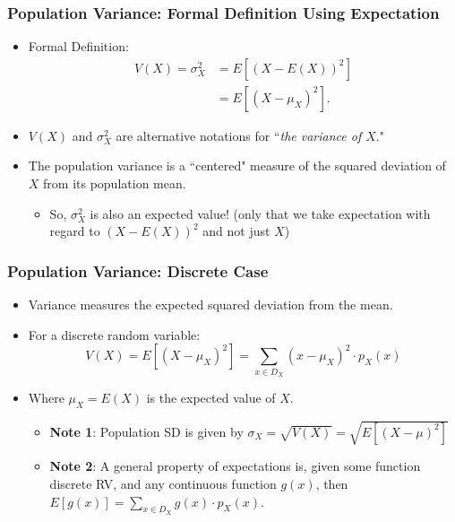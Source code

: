 \documentclass[handout]{beamer} %
\begin{document}
\begin{frame} %
\frametitle{Population Variance: Formal Definition Using Expectation}
\begin{itemize}
  \item Formal Definition: 
  \pause
  \begin{align*}
      V(X) = \sigma_X^2 &=  E[(X - E(X))^2]  \\
                        &=  E[(X - \mu_X)^2].
  \end{align*} \vspace{-1em}
  \pause
\item $V(X)$ and $\sigma_X^2$ are alternative notations for ``\emph{the variance of $X$}."   \pause 
\item The population variance is a ``centered" measure of the squared deviation of $X$ from its population mean.    \pause
\begin{itemize}
    \item So, $\sigma_X^2$ is also an expected value! (only that we take expectation with regard to $(X - E(X))^2$ and not just $X$)
\end{itemize}

\end{itemize}
\end{frame}

\begin{frame}
\frametitle{Population Variance: Discrete Case}

\begin{itemize}
  \item Variance measures the expected squared deviation from the mean.
  \item For a discrete random variable:
  \[
  V(X) =  E[(X - \mu_X)^2] =  \sum_{x \in D_X} (x - \mu_X)^2 \cdot p_X(x)
  \]
  \item Where $\mu_X = E(X)$ is the expected value of $X$.
  \begin{itemize}
      \item \textbf{Note 1}: Population SD is given by $\sigma_X = \sqrt{V(X)} = \sqrt{E[(X-\mu)^2]} $
      \item \textbf{Note 2}: A general property of expectations is, given some function discrete RV, and any continuous function $g(x)$, then $E[g(x)] = \sum_{x \in D_X} g(x) \cdot p_X(x)$.
  \end{itemize}
\end{itemize}

\end{frame}
\end{document}
